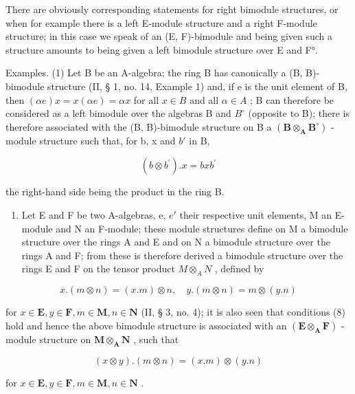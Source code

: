 There are obviously corresponding statements for right bimodule structures, or when for example there is a left E-module structure and a right F-module structure; in this case we speak of an (E, F)-bimodule and being given such a structure amounts to being given a left bimodule structure over E and F°.

Examples. (1) Let B be an A-algebra; the ring B has canonically a (B, B)-bimodule structure (II, § 1, no. 14, Example 1) and, if e is the unit element of B, then \((\alpha e)x = x(\alpha e) = \alpha x\) for all \(x \in B\) and all \(\alpha \in A\) ; B can therefore be considered as a left bimodule over the algebras B and \(B^{\circ}\) (opposite to B); there is therefore associated with the (B, B)-bimodule structure on B a \((\mathbf{B} \otimes_{\mathbf{A}} \mathbf{B}^{\circ})\) -module structure such that, for b, x and \(b'\) in B,

\[
(b \otimes b ^ {\prime}). x = b x b ^ {\prime}\tag{9}
\]

the right-hand side being the product in the ring B.

\begin{enumerate}
\def\labelenumi{(\arabic{enumi})}
\setcounter{enumi}{1}
\tightlist
\item
  Let E and F be two A-algebras, e, \(e'\) their respective unit elements, M an E-module and N an F-module; these module structures define on M a bimodule structure over the rings A and E and on N a bimodule structure over the rings A and F; from these is therefore derived a bimodule structure over the rings E and F on the tensor product \(M \otimes_{A} N\) , defined by
\end{enumerate}

\[
x. (m \otimes n) = (x. m) \otimes n, \quad y. (m \otimes n) = m \otimes (y. n)
\]

for \(x \in \mathbf{E}, y \in \mathbf{F}, m \in \mathbf{M}, n \in \mathbf{N}\) (II, § 3, no. 4); it is also seen that conditions (8) hold and hence the above bimodule structure is associated with an \((\mathbf{E} \otimes_{\mathbf{A}} \mathbf{F})\) -module structure on \(\mathbf{M} \otimes_{\mathbf{A}} \mathbf{N}\) , such that

\[
(x \otimes y). (m \otimes n) = (x. m) \otimes (y. n)\tag{10}
\]

for \(x \in \mathbf{E}, y \in \mathbf{F}, m \in \mathbf{M}, n \in \mathbf{N}\) .

